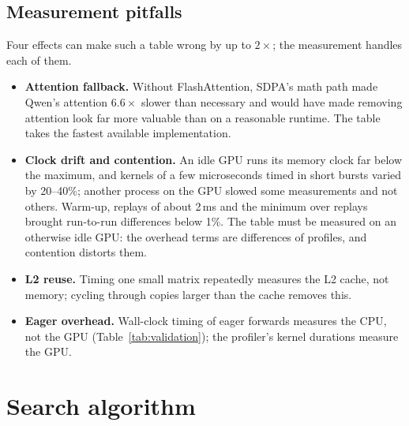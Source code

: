 \documentclass[11pt]{article}
\begin{document}
\subsection{Measurement pitfalls}
Four effects can make such a table wrong by up to $2\times$; the measurement handles each of them.
\begin{itemize}
  \item \textbf{Attention fallback.} Without FlashAttention, SDPA's math path made Qwen's attention
        $6.6\times$ slower than necessary and would have made removing attention look far more valuable
        than on a reasonable runtime. The table takes the fastest available implementation.
  \item \textbf{Clock drift and contention.} An idle GPU runs its memory clock far below the maximum,
        and kernels of a few microseconds timed in short bursts varied by 20--40\%; another process on
        the GPU slowed some measurements and not others. Warm-up, replays of about 2\,ms and the minimum
        over replays brought run-to-run differences below 1\%. The table must be measured on an
        otherwise idle GPU: the overhead terms are differences of profiles, and contention distorts them.
  \item \textbf{L2 reuse.} Timing one small matrix repeatedly measures the L2 cache, not memory;
        cycling through copies larger than the cache removes this.
  \item \textbf{Eager overhead.} Wall-clock timing of eager forwards measures the CPU, not the GPU
        (Table~\ref{tab:validation}); the profiler's kernel durations measure the GPU.
\end{itemize}

\section{Search algorithm}
\label{sec:search}
\end{document}
